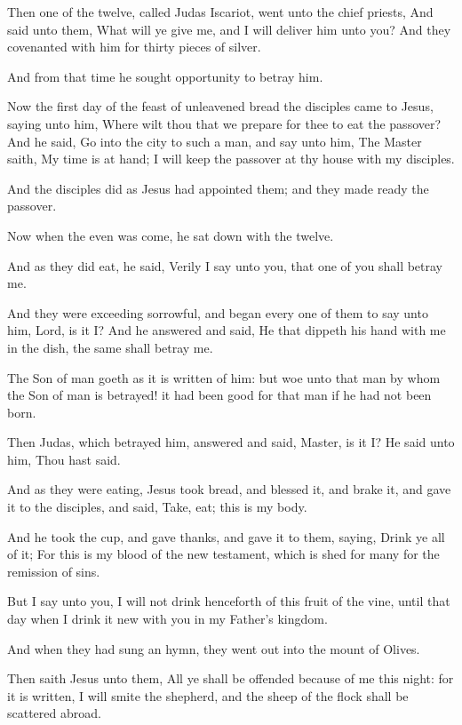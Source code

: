 \Verse Then one of the twelve, called Judas Iscariot, went unto the chief priests, \Verse And said unto them, What will ye give me, and I will deliver him unto you? And they covenanted with him for thirty pieces of silver.

\Verse And from that time he sought opportunity to betray him.

\Verse Now the first day of the feast of unleavened bread the disciples came to Jesus, saying unto him, Where wilt thou that we prepare for thee to eat the passover?  \Verse And he said, Go into the city to such a man, and say unto him, The Master saith, My time is at hand; I will keep the passover at thy house with my disciples.

\Verse And the disciples did as Jesus had appointed them; and they made ready the passover.

\Verse Now when the even was come, he sat down with the twelve.

\Verse And as they did eat, he said, Verily I say unto you, that one of you shall betray me.

\Verse And they were exceeding sorrowful, and began every one of them to say unto him, Lord, is it I?  \Verse And he answered and said, He that dippeth his hand with me in the dish, the same shall betray me.

\Verse The Son of man goeth as it is written of him: but woe unto that man by whom the Son of man is betrayed! it had been good for that man if he had not been born.

\Verse Then Judas, which betrayed him, answered and said, Master, is it I?  He said unto him, Thou hast said.

\Verse And as they were eating, Jesus took bread, and blessed it, and brake it, and gave it to the disciples, and said, Take, eat; this is my body.

\Verse And he took the cup, and gave thanks, and gave it to them, saying, Drink ye all of it; \Verse For this is my blood of the new testament, which is shed for many for the remission of sins.

\Verse But I say unto you, I will not drink henceforth of this fruit of the vine, until that day when I drink it new with you in my Father's kingdom.

\Verse And when they had sung an hymn, they went out into the mount of Olives.

\Verse Then saith Jesus unto them, All ye shall be offended because of me this night: for it is written, I will smite the shepherd, and the sheep of the flock shall be scattered abroad.

